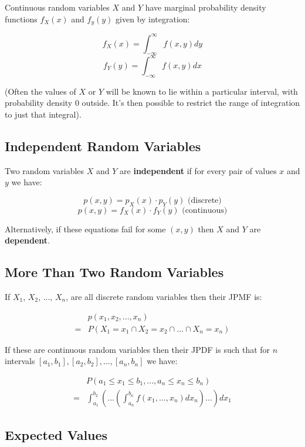 Continuous random variables $X$ and $Y$ have marginal probability density functions $f_X(x)$ and $f_y(y)$ given by integration:

$$ f_X(x) = \int_{-\infty}^{\infty} f(x,y) dy $$
$$ f_Y(y) = \int_{-\infty}^{\infty} f(x,y) dx $$

(Often the values of $X$ or $Y$ will be known to lie within a particular interval, with probability density $0$ outside. It's then possible to restrict the range of integration to just that integral).

\subsection*{Independent Random Variables}

Two random variables $X$ and $Y$ are \textbf{independent} if for every pair of values $x$ and $y$ we have:

$$ p(x,y) = p_X(x) \cdot p_Y(y) \text{ (discrete)} $$
$$ p(x,y) = f_X(x) \cdot f_Y(y) \text{ (continuous)} $$

Alternatively, if these equations fail for some $(x,y)$ then $X$ and $Y$ are \textbf{dependent}.

\subsection*{More Than Two Random Variables}

If $X_1$, $X_2$, ..., $X_n$, are all discrete random variables then their JPMF is:

\begin{align*}
    & p(x_1,x_2,...,x_n)                            \\
  = & P(X_1=x_1 \cap X_2=x_2 \cap ... \cap X_n=x_n)
\end{align*}

If these are continuous random variables then their JPDF is such that for $n$ intervals $[a_1,b_1], [a_2,b_2],...,[a_n,b_n]$ we have:

\begin{align*}
    & P(a_1 \leq x_1 \leq b_1,...,a_n\leq x_n \leq b_n)                                      \\
  = & \int_{a_1}^{b_2}\left(...\left(\int_{a_n}^{b_n}f(x_1,...,x_n)dx_n\right)...\right)dx_1
\end{align*}

\subsection*{Expected Values}

